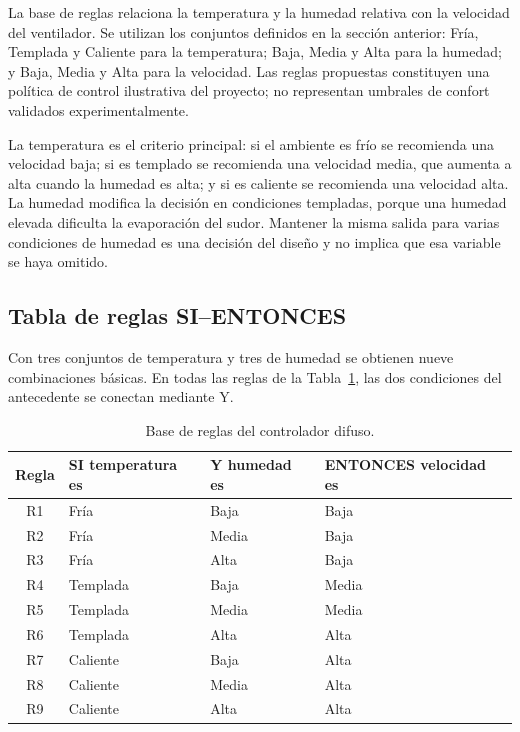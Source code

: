 \documentclass[11pt]{article}
\begin{document}
La base de reglas relaciona la temperatura y la humedad relativa con la
velocidad del ventilador. Se utilizan los conjuntos definidos en la sección
anterior: Fría, Templada y Caliente para la temperatura; Baja, Media y Alta
para la humedad; y Baja, Media y Alta para la velocidad. Las reglas propuestas
constituyen una política de control ilustrativa del proyecto; no representan
umbrales de confort validados experimentalmente.

La temperatura es el criterio principal: si el ambiente es frío se recomienda
una velocidad baja; si es templado se recomienda una velocidad media, que
aumenta a alta cuando la humedad es alta; y si es caliente se recomienda una
velocidad alta. La humedad modifica la decisión en condiciones templadas,
porque una humedad elevada dificulta la evaporación del sudor. Mantener la
misma salida para varias condiciones de humedad es una decisión del diseño
y no implica que esa variable se haya omitido.

\subsection{Tabla de reglas SI--ENTONCES}

Con tres conjuntos de temperatura y tres de humedad se obtienen nueve
combinaciones básicas. En todas las reglas de la Tabla~\ref{tab:reglas_p3},
las dos condiciones del antecedente se conectan mediante Y.

\begin{table}[htbp]
\centering
\caption{Base de reglas del controlador difuso.}
\label{tab:reglas_p3}
\begin{tabular}{clll}
\toprule
\textbf{Regla} & \textbf{SI temperatura es} & \textbf{Y humedad es}
& \textbf{ENTONCES velocidad es} \\
\midrule
R1 & Fría     & Baja  & Baja  \\
R2 & Fría     & Media & Baja  \\
R3 & Fría     & Alta  & Baja  \\
R4 & Templada & Baja  & Media \\
R5 & Templada & Media & Media \\
R6 & Templada & Alta  & Alta  \\
R7 & Caliente & Baja  & Alta  \\
R8 & Caliente & Media & Alta  \\
R9 & Caliente & Alta  & Alta  \\
\bottomrule
\end{tabular}
\end{table}
\end{document}
